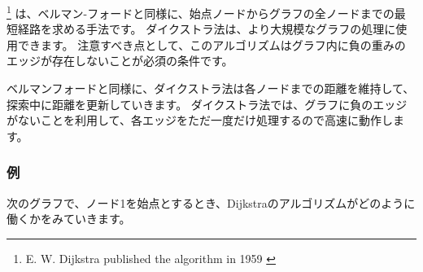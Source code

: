 
 \footnote{E. W. Dijkstra published the algorithm in 1959 \cite{dij59}}
は、ベルマン-フォードと同様に、始点ノードからグラフの全ノードまでの最短経路を求める手法です。
ダイクストラ法は、より大規模なグラフの処理に使用できます。
注意すべき点として、このアルゴリズムはグラフ内に負の重みのエッジが存在しないことが必須の条件です。

ベルマンフォードと同様に、ダイクストラ法は各ノードまでの距離を維持して、探索中に距離を更新していきます。
ダイクストラ法では、グラフに負のエッジがないことを利用して、各エッジをただ一度だけ処理するので高速に動作します。

\subsubsection{例}
次のグラフで、ノード1を始点とするとき、Dijkstraのアルゴリズムがどのように働くかをみていきます。

